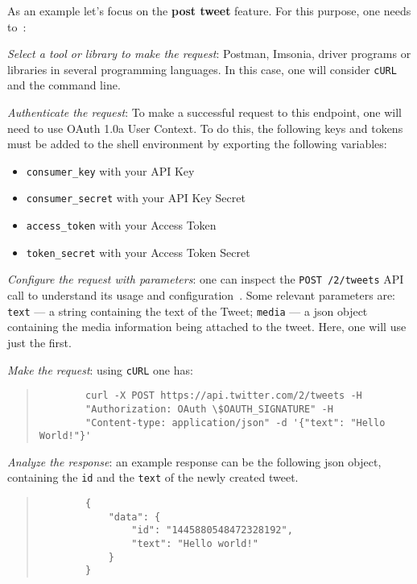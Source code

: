 As an example let's focus on the \textbf{post tweet} feature. For this purpose, one needs
to~\cite{twitterManageTweetQuickStart}:
\begin{enum-c}
\item \emph{Select a tool or library to make the request}:
  Postman, Imsonia,
  driver programs or libraries in several programming languages. In this case,
  one will consider \texttt{cURL} and the command line.
\item \emph{Authenticate the request}:
  To make a successful request to this endpoint, one will need to use OAuth 1.0a
  User Context. To do this, the following keys and tokens must be added to the
  shell environment by exporting the following variables:
  \begin{itemize}
    \item \texttt{consumer\_key} with your API Key
    \item \texttt{consumer\_secret} with your API Key Secret
    \item \texttt{access\_token} with your Access Token
    \item \texttt{token\_secret} with your Access Token Secret
    \end{itemize}
  \item \emph{Configure the request with parameters}: one can inspect the
    \texttt{POST /2/tweets} API call to understand its usage and
    configuration~\cite{twitterAPIRefPostTweet}. Some relevant parameters are:
    \texttt{text} --- a string containing the text of the Tweet; \texttt{media}
    --- a \gls{json} object containing the media information being attached to
    the tweet. Here, one will use just the first.
  \item \emph{Make the request}: using \texttt{cURL} one has:
    \begin{quote}
      \onehalfspacing
        \begin{verbatim}
        curl -X POST https://api.twitter.com/2/tweets -H 
        "Authorization: OAuth \$OAUTH_SIGNATURE" -H 
        "Content-type: application/json" -d '{"text": "Hello World!"}'
        \end{verbatim}
    \end{quote}
    \vspace{-7mm}
%
  \item \emph{Analyze the response}: an example response can be the following
    \gls{json} object,
    containing the \texttt{id} and the \texttt{text} of the newly created tweet.
    \begin{quote}
      \onehalfspacing
        \begin{verbatim}
        {
            "data": {
                "id": "1445880548472328192",
                "text": "Hello world!"
            }
        }
        \end{verbatim}
    \end{quote}
    \vspace{-7mm}
  \end{enum-c}

